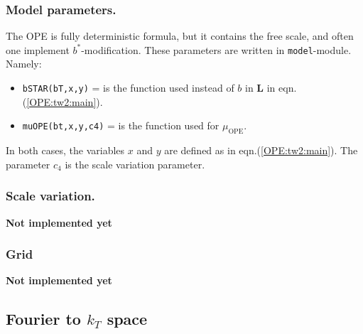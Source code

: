 \documentclass[prd,nofootinbib,eqsecnum,final]{revtex4}
\renewcommand{\(}{\left(}
\renewcommand{\)}{\right)}
\renewcommand{\[}{\left[}
\renewcommand{\]}{\right]}
\begin{document}
\subsubsection{Model parameters.} 

The OPE is fully deterministic formula, but it contains the free scale, and often one implement $b^*$-modification. These parameters are written in \texttt{model}-module. Namely:
\begin{itemize}
\item \texttt{bSTAR(bT,x,y)} = is the function used instead of $b$ in  $\mathbf{L}$ in eqn.(\ref{OPE:tw2:main}).
\item \texttt{muOPE(bt,x,y,c4)} = is the function used for $\mu_{\text{OPE}}$.
\end{itemize}
In both cases, the variables $x$ and $y$ are defined as in eqn.(\ref{OPE:tw2:main}). The parameter $c_4$ is the scale variation parameter.

\subsubsection{Scale variation.} 

\textbf{Not implemented yet}

\subsubsection{Grid}
\label{sec:OPEtw3:grid1}

\textbf{Not implemented yet}

\subsection{Fourier to $k_T$ space}
\label{sec:Fourier_to_kt}
\end{document}
